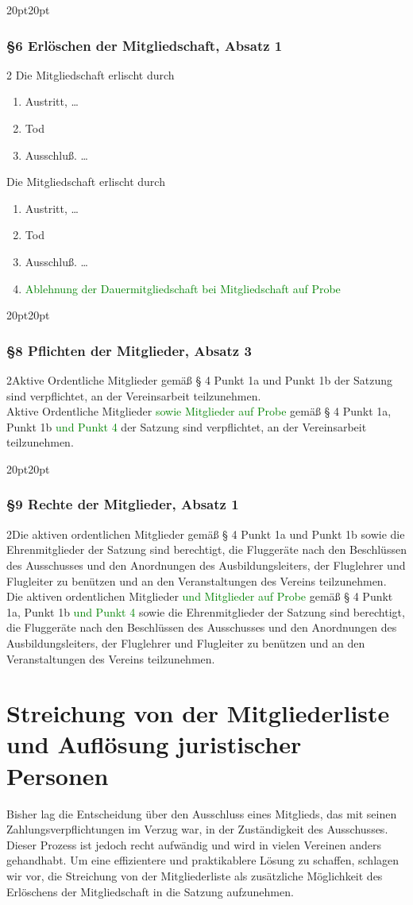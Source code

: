 \documentclass[10pt,a4paper,parskip=half]{scrartcl}
\newcommand{\new}[1]{\textcolor{Green}{#1}}
\newcommand{\change}[1]{
  \begin{adjustwidth}{20pt}{20pt}
    #1
  \end{adjustwidth}
}
\newcommand{\compare}[3]{\change{\subsubsection*{#1}\begin{multicols}{2}#2\columnbreak\\#3\end{multicols}}}
\begin{document}
\change{
  \subsubsection*{§6 Erlöschen der Mitgliedschaft, Absatz 1}
  \begin{multicols}{2}
    Die Mitgliedschaft erlischt durch
    \begin{enumerate}[label=\alph*)]
      \item Austritt, \dots
      \item Tod
      \item{Ausschluß.} \dots
    \end{enumerate}
    \columnbreak
    Die Mitgliedschaft erlischt durch
    \begin{enumerate}[label=\alph*)]
      \item Austritt, \dots
      \item Tod
      \item{Ausschluß.} \dots
      \item \new{Ablehnung der Dauermitgliedschaft bei Mitgliedschaft auf Probe}
    \end{enumerate}
  \end{multicols}
}

\clearpage
\compare{§8 Pflichten der Mitglieder, Absatz 3}
{Aktive Ordentliche Mitglieder gemäß § 4 Punkt 1a und Punkt 1b der Satzung sind verpflichtet, an der Vereinsarbeit teilzunehmen.}
{Aktive Ordentliche Mitglieder \new{sowie Mitglieder auf Probe} gemäß § 4 Punkt 1a, Punkt 1b \new{und Punkt 4} der Satzung sind verpflichtet, an der Vereinsarbeit teilzunehmen.}

\compare{§9 Rechte der Mitglieder, Absatz 1}
{Die aktiven ordentlichen Mitglieder gemäß § 4 Punkt 1a und Punkt 1b sowie die Ehrenmitglieder der Satzung sind berechtigt, die Fluggeräte nach den Beschlüssen des Ausschusses und den Anordnungen des Ausbildungsleiters, der Fluglehrer und Flugleiter zu benützen und an den Veranstaltungen des Vereins teilzunehmen.}
{Die aktiven ordentlichen Mitglieder \new{und Mitglieder auf Probe} gemäß § 4 Punkt 1a, Punkt 1b \new{und Punkt 4} sowie die Ehrenmitglieder der Satzung sind berechtigt, die Fluggeräte nach den Beschlüssen des Ausschusses und den Anordnungen des Ausbildungsleiters, der Fluglehrer und Flugleiter zu benützen und an den Veranstaltungen des Vereins teilzunehmen.}
\clearpage
\section{Streichung von der Mitgliederliste und Auflösung juristischer Personen}
Bisher lag die Entscheidung über den Ausschluss eines Mitglieds, das mit seinen Zahlungsverpflichtungen im Verzug war, in der Zuständigkeit des Ausschusses. Dieser Prozess ist jedoch recht aufwändig und wird in vielen Vereinen anders gehandhabt. Um eine effizientere und praktikablere Lösung zu schaffen, schlagen wir vor, die Streichung von der Mitgliederliste als zusätzliche Möglichkeit des Erlöschens der Mitgliedschaft in die Satzung aufzunehmen.
\end{document}
